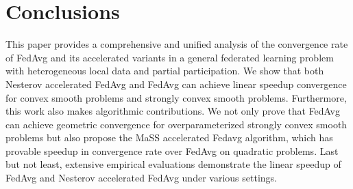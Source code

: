 
\section{Conclusions}
\begin{comment}
This paper provides a comprehensive and unified analysis of the convergence rate of FedAvg
and its accelerated variants in a general federated learning problem with heterogeneous local data and partial participation. We show that both Nesterov accelerated FedAvg and FedAvg
can achieve {\small{$\cO(\frac{1}{\sqrt{NT}})$}} linear speedup convergence for convex smooth problems and {\small{$\cO(\frac{1}{NT})$}} convergence for strongly 
convex smooth problems. In addition, we show that the local steps for stronlgy convex and convex smooth problems can be as large as {\small{$\cO(\sqrt{\frac{T}{N}})$}}, which can substantially save communication cost comparing to prior results. 
Furthermore, this work also makes algorithmic contributions. We not only prove that FedAvg can achieve exponential convergence for overparameterized strongly convex smooth problems, but also propose the MaSS accelerated Fedavg algorithm, which has provable speedup in convergence rate over FedAvg on quadratic problems. Last but not least, we empirically
verify the linear speedup of FedAvg and Nesterov accelerated FedAvg for strongly convex, convex smooth, and linear regression problems. The empirical results are well-aligned with our theories.		
\end{comment}
This paper provides a comprehensive and unified analysis of the convergence rate of FedAvg
and its accelerated variants in a general federated learning problem with heterogeneous local data and partial participation. 
We show that both Nesterov accelerated FedAvg and FedAvg can achieve linear speedup convergence for convex smooth problems and strongly 
convex smooth problems.  
Furthermore, this work also makes algorithmic contributions. We not only prove that FedAvg can achieve geometric convergence for overparameterized strongly convex smooth problems 
but also propose the MaSS accelerated Fedavg algorithm, which has provable speedup in convergence rate over FedAvg on quadratic problems. Last but not least, extensive empirical 
evaluations demonstrate the linear speedup of FedAvg and Nesterov accelerated FedAvg under various settings.	

